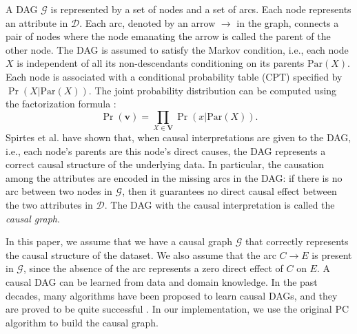 \documentclass[twoside,leqno,twocolumn]{article}
\begin{document}
A DAG $\mathcal{G}$ is represented by a set of nodes and a set of arcs. Each node represents an attribute in $\mathcal{D}$. %
Each arc, denoted by an arrow $\rightarrow$ in the graph, connects a pair of nodes where the node emanating the arrow is called the parent of the other node. The DAG is assumed to satisfy the Markov condition, i.e., each node $X$ is independent of all its non-descendants conditioning on its parents $\mathrm{Par}(X)$. 
Each node is associated with a conditional probability table (CPT) specified by $\Pr(X|\mathrm{Par}(X))$. The joint probability distribution can be computed using the factorization formula \cite{koller2009probabilistic}:
\begin{equation}\label{eq:ff}
\Pr(\mathbf{v}) = \prod_{X\in \mathbf{V}}\Pr(x|\mathrm{Par}(X)).
\end{equation}
Spirtes et al. \cite{spirtes2000causation} have shown that, when causal interpretations are given to the DAG, i.e., each node's parents are this node's direct causes, the DAG represents a correct causal structure of the underlying data. In particular, the causation among the attributes are encoded in the missing arcs in the DAG: if there is no arc between two nodes in $\mathcal{G}$, then it guarantees no direct causal effect between the two attributes in $\mathcal{D}$. The DAG with the  causal interpretation is called the \emph{causal graph}.


In this paper, we assume that we have a causal graph $\mathcal{G}$ that correctly represents the causal structure of the dataset. We also assume that the arc $C\rightarrow E$ is present in $\mathcal{G}$, since the absence of the arc represents a zero direct effect of $C$ on $E$. A causal DAG can be learned from data and domain knowledge. In the past decades, many algorithms have been proposed to learn causal DAGs, and they are proved to be quite successful \cite{spirtes2000causation,neapolitan2004learning,colombo2014order,kalisch2007estimating}. %
In our implementation, we use the original PC algorithm \cite{spirtes2000causation} to build the causal graph.
\end{document}
